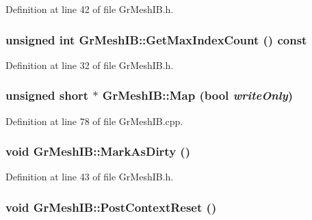 Definition at line 42 of file GrMeshIB.h.\hypertarget{class_gr_mesh_i_b_d87b87ba3f6eed6bbbf771f6209ffa25}{
\subsubsection[{GetMaxIndexCount}]{\setlength{\rightskip}{0pt plus 5cm}unsigned int GrMeshIB::GetMaxIndexCount () const}}
\label{class_gr_mesh_i_b_d87b87ba3f6eed6bbbf771f6209ffa25}




Definition at line 32 of file GrMeshIB.h.\hypertarget{class_gr_mesh_i_b_120496ea14cb6167d0f18e72fe69287e}{
\subsubsection[{Map}]{\setlength{\rightskip}{0pt plus 5cm}unsigned short $\ast$ GrMeshIB::Map (bool {\em writeOnly})}}
\label{class_gr_mesh_i_b_120496ea14cb6167d0f18e72fe69287e}




Definition at line 78 of file GrMeshIB.cpp.\hypertarget{class_gr_mesh_i_b_717553e324aa83599fdbcde6a6a3f0d3}{
\subsubsection[{MarkAsDirty}]{\setlength{\rightskip}{0pt plus 5cm}void GrMeshIB::MarkAsDirty ()}}
\label{class_gr_mesh_i_b_717553e324aa83599fdbcde6a6a3f0d3}




Definition at line 43 of file GrMeshIB.h.\hypertarget{class_gr_mesh_i_b_715a2cf171015c9b2fa8077ed592b4d9}{
\subsubsection[{PostContextReset}]{\setlength{\rightskip}{0pt plus 5cm}void GrMeshIB::PostContextReset ()}}
\label{class_gr_mesh_i_b_715a2cf171015c9b2fa8077ed592b4d9}




